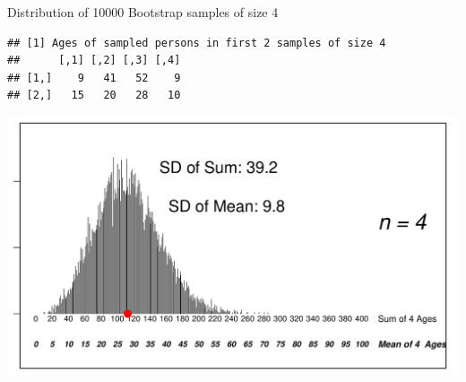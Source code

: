 \documentclass[10pt,handout]{beamer}\usepackage[]{graphicx}\usepackage[]{color}
\makeatletter
\def\maxwidth{ %
  \ifdim\Gin@nat@width>\linewidth
    \linewidth
  \else
    \Gin@nat@width
  \fi
}
\newenvironment{kframe}{%
 \def\at@end@of@kframe{}%
 \ifinner\ifhmode%
  \def\at@end@of@kframe{\end{minipage}}%
  \begin{minipage}{\columnwidth}%
 \fi\fi%
 \def\FrameCommand##1{\hskip\@totalleftmargin \hskip-\fboxsep
 \colorbox{shadecolor}{##1}\hskip-\fboxsep
     \hskip-\linewidth \hskip-\@totalleftmargin \hskip\columnwidth}%
 \MakeFramed {\advance\hsize-\width
   \@totalleftmargin\z@ \linewidth\hsize
   \@setminipage}}%
 {\par\unskip\endMakeFramed%
 \at@end@of@kframe}
\newenvironment{knitrout}{}{} %
\makeatother
\begin{document}
\begin{frame}[fragile]{Distribution of 10000 Bootstrap samples of size 4}
\begin{knitrout}\tiny
{}\color{fgcolor}\begin{kframe}
\begin{verbatim}
## [1] Ages of sampled persons in first 2 samples of size 4
##      [,1] [,2] [,3] [,4]
## [1,]    9   41   52    9
## [2,]   15   20   28   10
\end{verbatim}
\end{kframe}

{\centering \includegraphics[width=\maxwidth]{figure/unnamed-chunk-3-1} 

}


\end{knitrout}
	
\end{frame}
\end{document}
